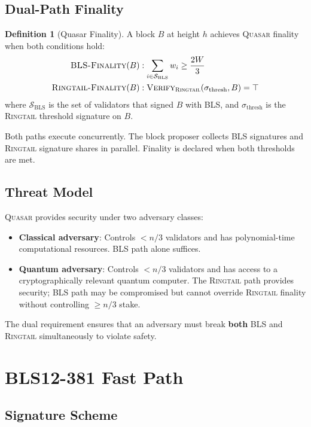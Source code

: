 \documentclass[11pt,letterpaper]{article}
\theoremstyle{definition}
\newtheorem{definition}{Definition}
\theoremstyle{remark}
\newcommand{\Quasar}{\textsc{Quasar}}
\newcommand{\Ringtail}{\textsc{Ringtail}}
\begin{document}
\subsection{Dual-Path Finality}

\begin{definition}[Quasar Finality]
A block $B$ at height $h$ achieves \Quasar{} finality when both conditions hold:
\begin{align}
\textsc{BLS-Finality}(B) &: \sum_{i \in \mathcal{S}_{\text{BLS}}} w_i \geq \frac{2W}{3} \label{eq:bls-fin} \\
\textsc{Ringtail-Finality}(B) &: \textsc{Verify}_{\Ringtail{}}(\sigma_{\text{thresh}}, B) = \top \label{eq:rt-fin}
\end{align}
where $\mathcal{S}_{\text{BLS}}$ is the set of validators that signed $B$ with BLS, and $\sigma_{\text{thresh}}$ is the \Ringtail{} threshold signature on $B$.
\end{definition}

Both paths execute concurrently. The block proposer collects BLS signatures and \Ringtail{} signature shares in parallel. Finality is declared when both thresholds are met.

\subsection{Threat Model}

\Quasar{} provides security under two adversary classes:

\begin{itemize}
\item \textbf{Classical adversary}: Controls $< n/3$ validators and has polynomial-time computational resources. BLS path alone suffices.
\item \textbf{Quantum adversary}: Controls $< n/3$ validators and has access to a cryptographically relevant quantum computer. The \Ringtail{} path provides security; BLS path may be compromised but cannot override \Ringtail{} finality without controlling $\geq n/3$ stake.
\end{itemize}

The dual requirement ensures that an adversary must break \textbf{both} BLS and \Ringtail{} simultaneously to violate safety.

\section{BLS12-381 Fast Path}

\subsection{Signature Scheme}
\end{document}
